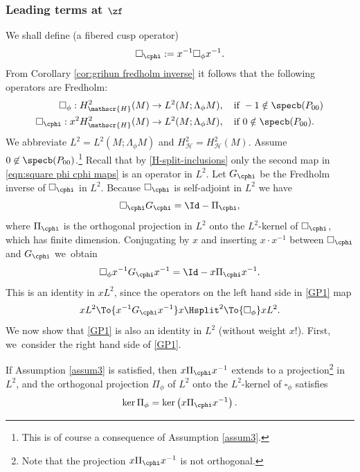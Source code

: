 \subsubsection{Leading terms at $\zf$}
We shall define (a fibered cusp operator)
\[
\square_{\cphi} := x^{-1}\square_\phi x^{-1}.
\]
From Corollary \ref{cor:grihun fredholm inverse} it follows that the following operators are Fredholm:
\begin{equation}
\label{eqn:square phi cphi maps}
\begin{split}
\square_\phi:H^2_{\mathscr{H}}(M)
&\to L^2(M;\Lambda_\phi M), \quad \text{if} \ -1 \notin \specb(P_{00}) \\
\square_{\cphi}:x^2H^2_{\mathscr{H}}(M)
&\to L^2(M;\Lambda_\phi M), \quad \text{if} \ 0 \notin \specb(P_{00}).
\end{split}
\end{equation}
We abbreviate $L^2=L^2(M;\Lambda_\phi M)$ and $H^2_{\mathscr{H}} = H^2_{\mathscr{H}}(M)$.
Assume $0\not\in \specb(P_{00})$.\footnote{This is of course a consequence of Assumption \ref{assum3}.}
Recall that by \eqref{H-split-inclusions} only the
second map in \eqref{eqn:square phi cphi maps} is an operator in $L^2$. Let $G_{\cphi}$ be the Fredholm inverse of $\square_{\cphi}$ in $L^2$. Because $\square_{\cphi}$ is self-adjoint in $L^2$ we have
\begin{equation}\label{cphi-Fredholm}
\square_{\cphi}G_{\cphi} = \Id - \Pi_{\cphi},
\end{equation}
where $\Pi_{\cphi}$ is the orthogonal projection in $L^2$ onto the $L^2$-kernel of $\square_{\cphi}$, which has finite dimension.
Conjugating by $x$ and inserting $x\cdot x^{-1}$ between $\square_{\cphi}$ and $G_{\cphi} $ we~obtain
\begin{equation}\label{GP1}
\square_{\phi} x^{-1} G_{\cphi} x^{-1} = \Id - x \Pi_{\cphi} x^{-1}.
\end{equation}
This is an identity in $x L^2$, since the operators on the left hand side in \eqref{GP1} map
\[
xL^2 \To{x^{-1} G_{\cphi} x^{-1} } x \Hsplit^2 \To{\square_\phi} xL^2.
\]
We now show that \eqref{GP1} is also an identity in $L^2$ (without weight $x$!).
First, we~consider the right hand side of \eqref{GP1}.
\begin{Lemma} \label{lem:ker piphi}
If Assumption \ref{assum3} is satisfied, then $x\Pi_{\cphi}x^{-1}$ extends to a projection\footnote{Note that the projection $x\Pi_{\cphi}x^{-1}$ is not orthogonal.} in $L^2$, and the orthogonal
projection $\Pi_\phi$ of $L^2$ onto the $L^2$-kernel of $\square_{\phi}$ satisfies
\[
\ker \Pi_\phi = \ker \left(x \Pi_{\cphi} x^{-1} \right).
\]
\end{Lemma}
